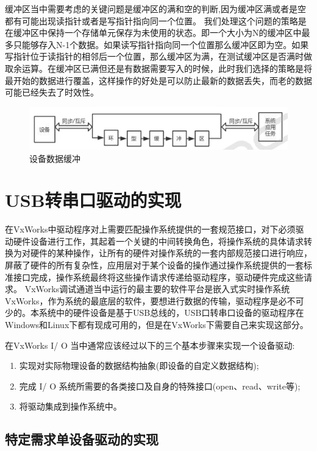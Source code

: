 	缓冲区当中需要考虑的关键问题是缓冲区的满和空的判断,因为缓冲区满或者是空都有可能出现读指针或者是写指针指向同一个位置。 我们处理这个问题的策略是在缓冲区中保持一个存储单元保存为未使用的状态。即一个大小为N的缓冲区中最多只能够存入N-1个数据。如果读写指针指向同一个位置那么缓冲区即为空。如果写指针位于读指针的相邻后一个位置，那么缓冲区为满，在测试缓冲区是否满时做取余运算。在缓冲区已满但还是有数据需要写入的时候，此时我们选择的策略是将最开始的数据进行覆盖，这样操作的好处是可以防止最新的数据丢失，而老的数据可能已经失去了时效性。

\begin{figure}[!h]
\centering
\includegraphics[width=.9\textwidth]{./graphics/Dev-Data-Buf.pdf}
\caption{设备数据缓冲}\label{fig:设备数据缓冲}
\end{figure}


\section{USB转串口驱动的实现}	
	在VxWorks中驱动程序对上需要匹配操作系统提供的一套规范接口，对下必须驱动硬件设备进行工作，其起着一个关键的中间转换角色，将操作系统的具体请求转换为对硬件的某种操作，让所有的硬件对操作系统的一套内部规范接口进行响应，屏蔽了硬件的所有复杂性，应用层对于某个设备的操作通过操作系统提供的一套标准接口完成，操作系统最终将这些操作请求传递给驱动程序，驱动硬件完成这些请求\cite{曹桂平2011VxWorks}。	
	VxWorks调试通道当中运行的最主要的软件平台是嵌入式实时操作系统VxWorks，作为系统的最底层的软件，要想进行数据的传输，驱动程序是必不可少的。本系统中的硬件设备是基于USB总线的，USB口转串口设备的驱动程序在Windows和Linux下都有现成可用的，但是在VxWorks下需要自己来实现这部分。
	
	在VxWorks I/ O 当中通常应该经过以下的三个基本步骤来实现一个设备驱动:
\begin{enumerate}
\item 实现对实际物理设备的数据结构抽象(即设备的自定义数据结构);
\item 完成 I/ O 系统所需要的各类接口及自身的特殊接口(open、read、write等);
\item 将驱动集成到操作系统中。
\end{enumerate}

\subsection{特定需求单设备驱动的实现}

